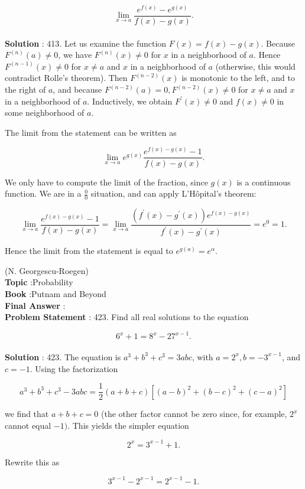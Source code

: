 \documentclass[10pt]{article}
\begin{document}
$$
\lim _{x \rightarrow a} \frac{e^{f(x)}-e^{g(x)}}{f(x)-g(x)} .
$$
\\
\textbf{Solution} :
413. Let us examine the function $F(x)=f(x)-g(x)$. Because $F^{(n)}(a) \neq 0$, we have $F^{(n)}(x) \neq 0$ for $x$ in a neighborhood of $a$. Hence $F^{(n-1)}(x) \neq 0$ for $x \neq a$ and $x$ in a neighborhood of $a$ (otherwise, this would contradict Rolle's theorem). Then $F^{(n-2)}(x)$ is monotonic to the left, and to the right of $a$, and because $F^{(n-2)}(a)=0, F^{(n-2)}(x) \neq 0$ for $x \neq a$ and $x$ in a neighborhood of $a$. Inductively, we obtain $F^{\prime}(x) \neq 0$ and $f(x) \neq 0$ in some neighborhood of $a$.

The limit from the statement can be written as

$$
\lim _{x \rightarrow a} e^{g(x)} \frac{e^{f(x)-g(x)}-1}{f(x)-g(x)} .
$$

We only have to compute the limit of the fraction, since $g(x)$ is a continuous function. We are in a $\frac{0}{0}$ situation, and can apply L'Hôpital's theorem:

$$
\lim _{x \rightarrow a} \frac{e^{f(x)-g(x)}-1}{f(x)-g(x)}=\lim _{x \rightarrow a} \frac{\left(f^{\prime}(x)-g^{\prime}(x)\right) e^{f(x)-g(x)}}{f^{\prime}(x)-g^{\prime}(x)}=e^{0}=1 .
$$

Hence the limit from the statement is equal to $e^{g(a)}=e^{\alpha}$.

(N. Georgescu-Roegen)
\\
\textbf{Topic} :Probability\\
\textbf{Book} :Putnam and Beyond\\
\textbf{Final Answer} :\\


\textbf{Problem Statement} :
423. Find all real solutions to the equation

$$
6^{x}+1=8^{x}-27^{x-1} .
$$
\\
\textbf{Solution} :
423. The equation is $a^{3}+b^{3}+c^{3}=3 a b c$, with $a=2^{x}, b=-3^{x-1}$, and $c=-1$. Using the factorization

$$
a^{3}+b^{3}+c^{3}-3 a b c=\frac{1}{2}(a+b+c)\left[(a-b)^{2}+(b-c)^{2}+(c-a)^{2}\right]
$$

we find that $a+b+c=0$ (the other factor cannot be zero since, for example, $2^{x}$ cannot equal $-1)$. This yields the simpler equation

$$
2^{x}=3^{x-1}+1 .
$$

Rewrite this as

$$
3^{x-1}-2^{x-1}=2^{x-1}-1 .
$$
\end{document}
